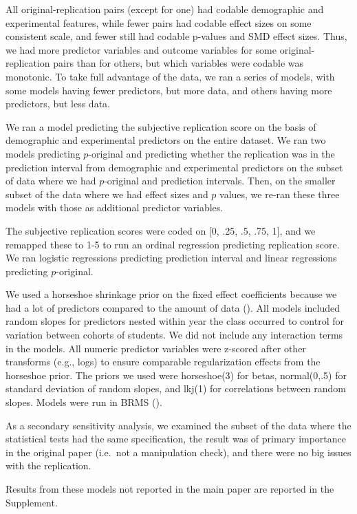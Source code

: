 \documentclass[
  english,
  a4paper,
]{article}
\begin{document}
All original-replication pairs (except for one) had codable demographic and experimental features, while fewer pairs had codable effect sizes on some consistent scale, and fewer still had codable p-values and SMD effect sizes. Thus, we had more predictor variables and outcome variables for some original-replication pairs than for others, but which variables were codable was monotonic. To take full advantage of the data, we ran a series of models, with some models having fewer predictors, but more data, and others having more predictors, but less data.

We ran a model predicting the subjective replication score on the basis of demographic and experimental predictors on the entire dataset. We ran two models predicting \(p\)-original and predicting whether the replication was in the prediction interval from demographic and experimental predictors on the subset of data where we had \(p\)-original and prediction intervals. Then, on the smaller subset of the data where we had effect sizes and \(p\) values, we re-ran these three models with those as additional predictor variables.

The subjective replication scores were coded on {[}0, .25, .5, .75, 1{]}, and we remapped these to 1-5 to run an ordinal regression predicting replication score. We ran logistic regressions predicting prediction interval and linear regressions predicting \(p\)-original.

We used a horseshoe shrinkage prior on the fixed effect coefficients because we had a lot of predictors compared to the amount of data (). All models included random slopes for predictors nested within year the class occurred to control for variation between cohorts of students. We did not include any interaction terms in the models. All numeric predictor variables were z-scored after other transforms (e.g., logs) to ensure comparable regularization effects from the horseshoe prior. The priors we used were horseshoe(3) for betas, normal(0,.5) for standard deviation of random slopes, and lkj(1) for correlations between random slopes. Models were run in BRMS ().

As a secondary sensitivity analysis, we examined the subset of the data where the statistical tests had the same specification, the result was of primary importance in the original paper (i.e.~not a manipulation check), and there were no big issues with the replication.

Results from these models not reported in the main paper are reported in the Supplement.
\end{document}
